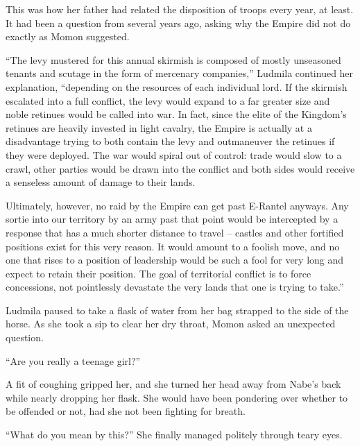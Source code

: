  

This was how her father had related the disposition of troops every year, at least. It had been a question from several years ago, asking why the Empire did not do exactly as Momon suggested.

 

“The levy mustered for this annual skirmish is composed of mostly unseasoned tenants and scutage in the form of mercenary companies,” Ludmila continued her explanation, “depending on the resources of each individual lord. If the skirmish escalated into a full conflict, the levy would expand to a far greater size and noble retinues would be called into war. In fact, since the elite of the Kingdom’s retinues are heavily invested in light cavalry, the Empire is actually at a disadvantage trying to both contain the levy and outmaneuver the retinues if they were deployed. The war would spiral out of control: trade would slow to a crawl, other parties would be drawn into the conflict and both sides would receive a senseless amount of damage to their lands.

 

Ultimately, however, no raid by the Empire can get past E-Rantel anyways. Any sortie into our territory by an army past that point would be intercepted by a response that has a much shorter distance to travel – castles and other fortified positions exist for this very reason. It would amount to a foolish move, and no one that rises to a position of leadership would be such a fool for very long and expect to retain their position. The goal of territorial conflict is to force concessions, not pointlessly devastate the very lands that one is trying to take.”

 

Ludmila paused to take a flask of water from her bag strapped to the side of the horse. As she took a sip to clear her dry throat, Momon asked an unexpected question.

 

“Are you really a teenage girl?”

 

A fit of coughing gripped her, and she turned her head away from Nabe’s back while nearly dropping her flask. She would have been pondering over whether to be offended or not, had she not been fighting for breath.

 

“What do you mean by this?” She finally managed politely through teary eyes.

 

